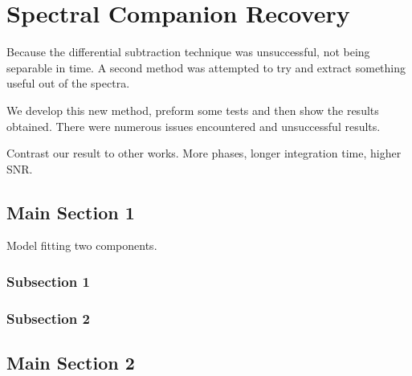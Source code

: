 
\chapter{Spectral Companion Recovery}  %

\label{cha:model_comparison}


Because the differential subtraction technique was unsuccessful, not being separable in time. A second method was attempted to try and extract something useful out of the spectra.

We develop this new method, preform some tests and then show the results obtained. There were numerous issues encountered and unsuccessful results.
 
Contrast our result to other works.  More phases, longer integration time, higher SNR. 


 
\section{Main Section 1}
Model fitting two components.



\subsection{Subsection 1}



\subsection{Subsection 2}


\section{Main Section 2}




